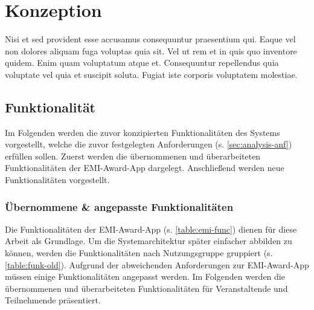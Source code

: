 \chapter{Konzeption}

Nisi et sed provident esse accusamus consequuntur praesentium qui. Eaque vel non dolores aliquam fuga voluptas quia sit. Vel ut rem et in quis quo inventore quidem. Enim quam voluptatum atque et. Consequuntur repellendus quia voluptate vel quia et suscipit soluta. Fugiat iste corporis voluptatem molestiae.

\section{Funktionalität} \label{sec:concept-func}

Im Folgenden werden die zuvor konzipierten Funktionalitäten des Systems
vorgestellt, welche die zuvor festgelegten Anforderungen (s.
\autoref{sec:analysis-anf}) erfüllen sollen. Zuerst werden die übernommenen und
überarbeiteten Funktionalitäten der EMI-Award-App dargelegt. Anschließend werden
neue Funktionalitäten vorgestellt.

\subsection{Übernommene \& angepasste Funktionalitäten}

Die Funktionalitäten der EMI-Award-App (s. \autoref{table:emi-func}) dienen für
diese Arbeit als Grundlage. Um die Systemarchitektur später einfacher abbilden
zu können, werden die Funktionalitäten nach Nutzungsgruppe gruppiert (s.
\autoref{table:funk-old}). Aufgrund der abweichenden Anforderungen zur
EMI-Award-App müssen einige Funktionalitäten angepasst werden. Im Folgenden
werden die übernommenen und überarbeiteten Funktionalitäten für Veranstaltende
und Teilnehmende präsentiert.

